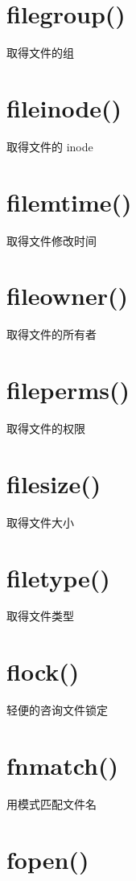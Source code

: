 \section{filegroup()}

取得文件的组

\section{fileinode()}

取得文件的 inode

\section{filemtime()}

取得文件修改时间

\section{fileowner()}

取得文件的所有者

\section{fileperms()}

取得文件的权限

\section{filesize()}

取得文件大小

\section{filetype()}

取得文件类型

\section{flock()}

轻便的咨询文件锁定

\section{fnmatch()}

用模式匹配文件名

\section{fopen()}

